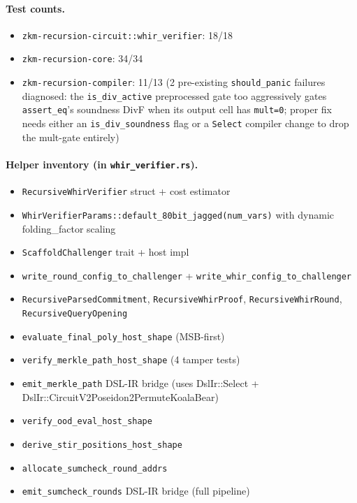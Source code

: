 \paragraph{Test counts.}
\begin{itemize}
  \item \texttt{zkm-recursion-circuit::whir\_verifier}: 18/18
  \item \texttt{zkm-recursion-core}: 34/34
  \item \texttt{zkm-recursion-compiler}: 11/13 (2 pre-existing
        \texttt{should\_panic} failures diagnosed: the
        \texttt{is\_div\_active} preprocessed gate too aggressively
        gates \texttt{assert\_eq}'s soundness DivF when its output
        cell has \texttt{mult=0}; proper fix needs either an
        \texttt{is\_div\_soundness} flag or a \texttt{Select}
        compiler change to drop the mult-gate entirely)
\end{itemize}

\paragraph{Helper inventory (in \texttt{whir\_verifier.rs}).}
\begin{itemize}
  \item \texttt{RecursiveWhirVerifier} struct + cost estimator
  \item \texttt{WhirVerifierParams::default\_80bit\_jagged(num\_vars)}
        with dynamic folding\_factor scaling
  \item \texttt{ScaffoldChallenger} trait + host impl
  \item \texttt{write\_round\_config\_to\_challenger} +
        \texttt{write\_whir\_config\_to\_challenger}
  \item \texttt{RecursiveParsedCommitment},
        \texttt{RecursiveWhirProof}, \texttt{RecursiveWhirRound},
        \texttt{RecursiveQueryOpening}
  \item \texttt{evaluate\_final\_poly\_host\_shape} (MSB-first)
  \item \texttt{verify\_merkle\_path\_host\_shape} (4 tamper tests)
  \item \texttt{emit\_merkle\_path} DSL-IR bridge (uses
        DslIr::Select + DslIr::CircuitV2Poseidon2PermuteKoalaBear)
  \item \texttt{verify\_ood\_eval\_host\_shape}
  \item \texttt{derive\_stir\_positions\_host\_shape}
  \item \texttt{allocate\_sumcheck\_round\_addrs}
  \item \texttt{emit\_sumcheck\_rounds} DSL-IR bridge (full pipeline)
\end{itemize}

